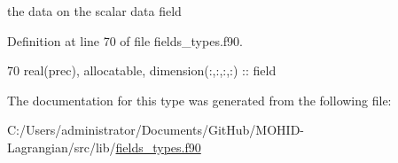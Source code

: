 the data on the scalar data field 



Definition at line 70 of file fields\+\_\+types.\+f90.


\begin{DoxyCode}
70         \textcolor{keywordtype}{real(prec)}, \textcolor{keywordtype}{allocatable}, \textcolor{keywordtype}{dimension(:,:,:,:)} :: field
\end{DoxyCode}


The documentation for this type was generated from the following file\+:\begin{DoxyCompactItemize}
\item 
C\+:/\+Users/administrator/\+Documents/\+Git\+Hub/\+M\+O\+H\+I\+D-\/\+Lagrangian/src/lib/\mbox{\hyperlink{fields__types_8f90}{fields\+\_\+types.\+f90}}\end{DoxyCompactItemize}
